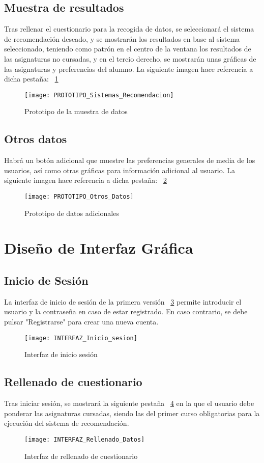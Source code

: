 \subsection{Muestra de resultados}
Tras rellenar el cuestionario para la recogida de datos, se seleccionará el sistema de recomendación deseado, y se mostrarán los resultados en base al sistema seleccionado, teniendo como patrón en el centro de la ventana los resultados de las asignaturas no cursadas, y en el tercio derecho, se mostrarán unas gráficas de las asignaturas y preferencias del alumno. La siguiente imagen hace referencia a dicha pestaña: ~\ref{fig:C.2.3}
\begin{figure}[h]
\centering
\texttt{[image: PROTOTIPO\_Sistemas\_Recomendacion]}
\caption{Prototipo de la muestra de datos}
\label{fig:C.2.3}
\end{figure}

\subsection{Otros datos}
Habrá un botón adicional que muestre las preferencias generales de media de los usuarios, así como otras gráficas para información adicional al usuario. 
La siguiente imagen hace referencia a dicha pestaña: ~\ref{fig:C.2.4}
\begin{figure}[h]
\centering
\texttt{[image: PROTOTIPO\_Otros\_Datos]}
\caption{Prototipo de datos adicionales}
\label{fig:C.2.4}
\end{figure}

\section{Diseño de Interfaz Gráfica }
\subsection{Inicio de Sesión}
La interfaz de inicio de sesión de la primera versión ~\ref{fig:C.3.1}  permite introducir el usuario y la contraseña en caso de estar registrado. En caso contrario, se debe pulsar "Registrarse" para crear una nueva cuenta. 
\begin{figure}[h]
\centering
\texttt{[image: INTERFAZ\_Inicio\_sesion]}
\caption{Interfaz de inicio sesión}
\label{fig:C.3.1}
\end{figure}

\subsection{Rellenado de cuestionario}
Tras iniciar sesión, se mostrará la siguiente pestaña ~\ref{fig:C.3.2} en la que el usuario debe ponderar las asignaturas cursadas, siendo las del primer curso obligatorias para la ejecución del sistema de recomendación. 
\begin{figure}[h]
\centering
\texttt{[image: INTERFAZ\_Rellenado\_Datos]}
\caption{Interfaz de rellenado de cuestionario}
\label{fig:C.3.2}
\end{figure}

